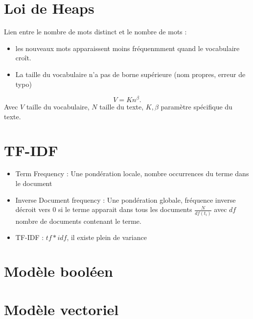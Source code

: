 \documentclass{article}
\theoremstyle{plain}%
\theoremstyle{definition}
\theoremstyle{remark}
\begin{document}
\section{Loi de Heaps}
Lien entre le nombre de mots distinct et le nombre de mots : \begin{itemize}
    \item les nouveaux mots apparaissent moins fréquenmment quand le vocabulaire croît. 
    \item La taille du vocabulaire n'a pas de borne supérieure (nom propres, erreur de typo)
\end{itemize} 
\[
    V = K n ^\beta 
.\]
Avec $ V $ taille du vocabulaire, $ N $ taille du texte, $ K, \beta  $ paramètre spécifique du texte.

\section{TF-IDF}
\begin{itemize}
    \item Term Frequency : Une pondération locale, nombre occurrences du terme dans le document
    \item Inverse Document frequency : Une pondération globale, fréquence inverse décroit vers 0 si le terme apparait dans tous les documents $ \frac{N}{df(t_i)} $ avec $ df $ nombre de documents contenant le terme. 
    \item TF-IDF : $ tf * idf $, il existe plein de variance
\end{itemize}


\section{Modèle booléen}
\section{Modèle vectoriel}
\end{document}
